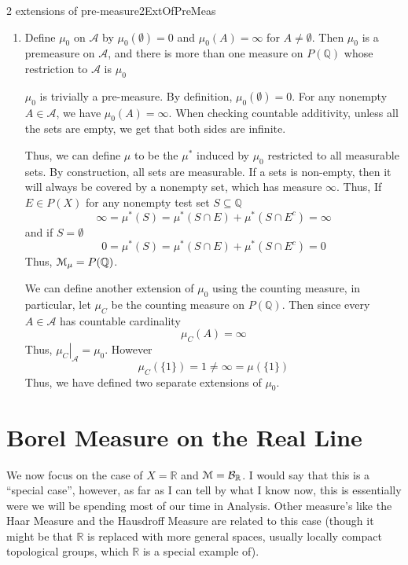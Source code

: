 \documentclass[oneside]{book}
\newcommand{\Q}{\mathbb{Q}}
\newcommand{\R}{\mathbb{R}}
\newcommand{\CA}{\mathcal{A}}
\newcommand{\MM}{\EuScript{M}}
\newcommand{\BB}{\mathcal{B}}
\newcommand{\sse}{\subseteq}
\begin{document}
\begin{example}{2 extensions of pre-measure}{2ExtOfPreMeas}
\begin{enumerate}
\begin{Proof}
\[			\]
			hence, every singleton is inside the $\sigma$-algebra of $\Q$. Since every subset of $\Q$ is
			countable, every subset is the countable union of singletons. Since every singleton is inside
			the $\sigma$-algebra, we have that the $\sigma$-algebra is $P(\Q)$. 
		\end{Proof}
	\item Define $\mu_0$ on $\CA$ by $\mu_0(\emptyset) = 0$ and $\mu_0(A) = \infty$ for $A \ne \emptyset$.
		Then $\mu_0$ is a premeasure on $\CA$, and there is more than one measure on $P(\Q)$ whose
		restriction to $\CA$ is $\mu_0$
		\begin{Proof}
			$\mu_0$ is trivially a pre-measure. By definition, $\mu_0(\emptyset) = 0$. For any nonempty $A
			\in \CA$, we have $ \mu_0(A) = \infty$. When checking countable additivity, unless all the sets
			are empty, we get that both sides are infinite. 

			Thus, we can define $\mu$ to be the $\mu^*$ induced by $\mu_0$ restricted to all measurable
			sets. By construction, all sets are measurable. If a sets is non-empty, then it will always be
			covered by a nonempty set, which has measure $\infty$. Thus, If $E \in P(X)$ for any nonempty
			test set $S \sse \Q$
			\[
				\infty = \mu^*(S)  = \mu^*(S\cap E) + \mu^*(S\cap E^c) = \infty
			\]
			and if $S = \emptyset$
			\[
				0 = \mu^*(S)  = \mu^*(S\cap E) + \mu^*(S\cap E^c) = 0
			\]
			Thus, $\MM_\mu = P(\Q)$. 

			We can define another extension of $\mu_0$ using the counting measure, in particular, let $\mu_C$
			be the counting measure on $P(\Q)$. Then since every $A \in \CA$ has countable cardinality
			\[
				\mu_C(A) = \infty
			\]
			Thus, $\left.\mu_C\right|_{\CA} = \mu_0$. However
				\[
					\mu_C(\{1\}) = 1 \ne \infty = \mu(\{1\})
				\]
			Thus, we have defined two separate extensions of $\mu_0$. 
		\end{Proof}
	\end{enumerate}
\end{example}


\section{Borel Measure on the Real Line}

We now focus on the case of $X = \R$ and $\MM = \BB_\R$. I would say that this is a ``special case'', however, as far as
I can tell by what I know now, this is essentially were we will be spending most of our time in Analysis. Other
measure's like the Haar Measure and the Hausdroff Measure are related to this case (though it might be that $\R$ is
replaced with more general spaces, usually locally compact topological groups, which $\R$ is a special example of). 
\end{document}
